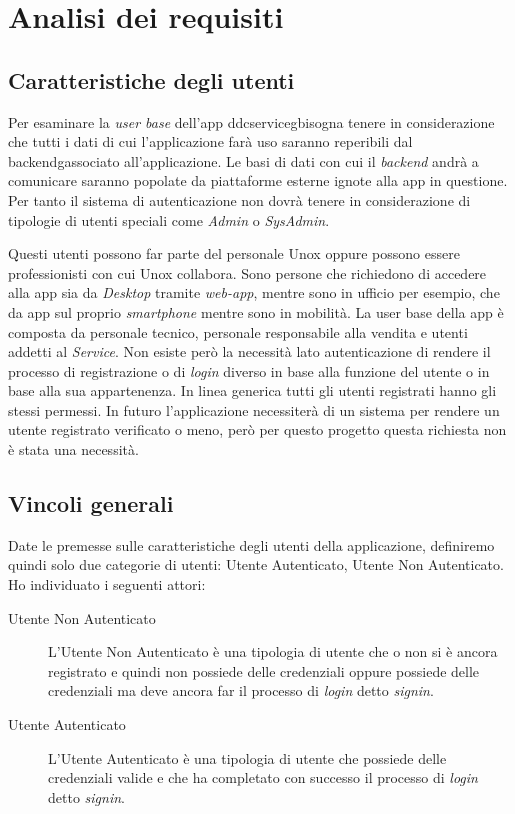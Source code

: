 \chapter{Analisi dei requisiti}
\label{chap:analisi_requisiti}

\section{Caratteristiche degli utenti}
Per esaminare la \textit{user base} dell'app \gls{ddcserviceg}\glox bisogna tenere in considerazione 
che tutti i dati di cui l'applicazione farà uso saranno reperibili dal \gls{backendg}\glox associato all'applicazione.
Le basi di dati con cui il \textit{backend} andrà a comunicare saranno popolate da piattaforme esterne ignote alla app in questione.
Per tanto il sistema di autenticazione non dovrà tenere in considerazione di tipologie di utenti speciali come \textit{Admin} o \textit{SysAdmin}.

Questi utenti possono far parte del personale Unox oppure possono essere professionisti con cui Unox collabora.
Sono persone che richiedono di accedere alla app sia da \textit{Desktop} tramite \textit{web-app}, mentre sono in ufficio per esempio, che da app sul proprio \textit{smartphone} mentre sono in mobilità.
La user base della app è composta da personale tecnico, personale responsabile alla vendita e utenti addetti al \textit{Service}.
Non esiste però la necessità lato autenticazione di rendere il processo di registrazione o di \textit{login} diverso in base alla funzione del utente o in base alla sua appartenenza.
In linea generica tutti gli utenti registrati hanno gli stessi permessi.
In futuro l'applicazione necessiterà di un sistema per rendere un utente registrato verificato o meno, però per questo progetto questa richiesta non è stata una necessità.

\section{Vincoli generali}
Date le premesse sulle caratteristiche degli utenti della applicazione, definiremo quindi solo due categorie di utenti: Utente Autenticato, Utente Non Autenticato.
Ho individuato i seguenti attori:
\begin{description}
	\item[Utente Non Autenticato] L'Utente Non Autenticato è una tipologia di utente che o non si è ancora registrato e quindi non possiede delle credenziali oppure possiede delle credenziali ma deve ancora far il processo di \textit{login} detto \textit{signin}.
	\item[Utente Autenticato] L'Utente Autenticato è una tipologia di utente che possiede delle credenziali valide e che ha completato con successo il processo di \textit{login} detto \textit{signin}.
\end{description}

